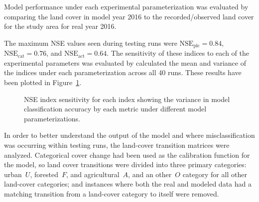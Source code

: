 Model performance under each experimental parameterization was
evaluated by comparing the land cover in model year 2016 to
the recorded/observed land cover for the study area for real year 2016.

The maximum NSE values seen during testing runs were 
$\text{NSE}_\text{plc} = 0.84$,
$\text{NSE}_\text{cat} = 0.76$, and
$\text{NSE}_\text{act} = 0.64$.
The sensitivity of these indices to each of the experimental parameters
was evaluated by calculated the mean and variance of the indices
under each parameterization across all 40 runs.
These results have been plotted in Figure~\ref{fig:land_nse}.

\begin{figure}
    \centering
    \hfill
    \hfill
    \caption{NSE index sensitivity for each index showing the variance in
    model classification accuracy by each metric under different model
    parameterizations.}
    \label{fig:land_nse}
\end{figure}

In order to better understand the output of the model and where misclassification was
occurring within testing runs, the land-cover transition matrices were analyzed.
Categorical cover change had been used as the calibration function for the model,
so land cover transitions were divided into three primary categories: urban~$U$,
forested~$F$, and agricultural~$A$, and an other~$O$ category for all other land-cover categories;
and instances where both the real and modeled data
had a matching transition from a land-cover category to itself were removed.

